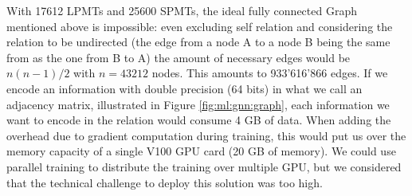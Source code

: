 \documentclass[../main.tex]{subfiles}
\begin{document}
With 17612 LPMTs and 25600 SPMTs, the ideal fully connected Graph mentioned above is impossible: even excluding self relation and considering the relation to be undirected (the edge from a node A to a node B being the same from
as the one from B to A) the amount of necessary edges would be $n(n-1)/2$ with $n = 43212$
nodes. This amounts to 933'616'866 edges. If we encode an information with double precision (64 bits) in what we call an adjacency matrix, illustrated in Figure \ref{fig:ml:gnn:graph}, each information we want to encode in the relation would consume 4 GB of data. When adding the overhead due to gradient computation during training, this would put us over the memory capacity of a single V100 GPU card (20 GB of memory).
We could use parallel training to distribute the training over multiple GPU, but we considered that the technical challenge to deploy this solution was too high.



\end{document}

